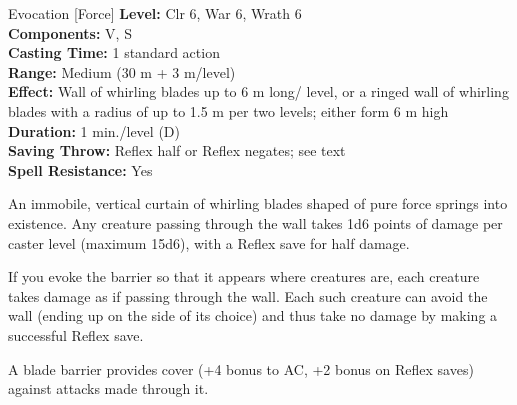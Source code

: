 {Evocation [Force]}
{
	\textbf{Level:}
	Clr 6, War 6, Wrath 6\\
	\textbf{Components:}
	V, S\\
	\textbf{Casting Time:}
	1 standard action\\
	\textbf{Range:}
	Medium (30 m + 3 m/level)\\
	\textbf{Effect:}
	Wall of whirling blades up to 6 m long/ level, or a ringed wall of whirling blades with a radius of up to 1.5 m per two levels; either form 6 m high\\
	\textbf{Duration:}
	1 min./level (D)\\
	\textbf{Saving Throw:}
	Reflex half or Reflex negates; see text\\
	\textbf{Spell Resistance:}
	Yes\\
}
{
	An immobile, vertical curtain of whirling blades shaped of pure force springs into existence. Any creature passing through the wall takes 1d6 points of damage per caster level (maximum 15d6), with a Reflex save for half damage.

	If you evoke the barrier so that it appears where creatures are, each creature takes damage as if passing through the wall. Each such creature can avoid the wall (ending up on the side of its choice) and thus take no damage by making a successful Reflex save.

	A blade barrier provides cover (+4 bonus to AC, +2 bonus on Reflex saves) against attacks made through it.

}
